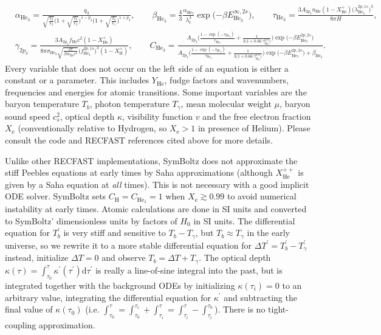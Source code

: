\documentclass{aa}
\newcommand\el{\mathrm{e}} %
\newcommand\Hy{\mathrm{H}} %
\newcommand\He{\mathrm{He}} %
\newcommand\Hesin{{\mathrm{He}_1}} %
\newcommand\Hetri{{\mathrm{He}_3}} %
\begin{document}
\begin{align*}
&
\alpha_\Hetri = \frac{q_3 }{ \sqrt{\frac{T_b}{T_2}} \Big(1+\sqrt{\frac{T_b}{T_2}}\Big)^{1-p_3} \Big(1+\sqrt{\frac{T_b}{T_1}}\Big)^{1+p_3} }, \qquad
\beta_\Hetri = \frac43 \frac{ \alpha_\Hetri }{ \lambda_\el^3 } \exp\big({-\beta E_\Hetri^{\infty,2s}}\big), \qquad
\tau_\Hetri = \frac{ 3 A_{2p_3} n_\He (1-X_\He^+) \big(\lambda_\Hetri^{2p,1s}\big)^3 }{ 8\pi H }, \\
&
\gamma_{2p_3} = \frac{ 3 A_{2p_3} f_\He c^2 (1-X_\He^+) }{ 8\pi \sigma_{\Hetri} \sqrt{\frac{2 \pi}{\beta m_\He c^2}} \big(f_\Hetri^{2p,1s}\big)^3 (1-X_\Hy^+) }, \qquad
C_\Hetri = \frac{ A_{2p_3} \bigg( \frac{1 - \exp({-\tau_\Hetri}) }{ \tau_\Hetri } + \frac{1}{3\big(1+0.66\,\gamma_{2p_3}^{0.9}\big)} \bigg) \exp\big({-\beta E_\Hetri^{2p,2s}}\big) }{ A_{2p_3} \bigg( \frac{1 - \exp({-\tau_\Hetri}) }{ \tau_\Hetri } + \frac{1}{3\big(1+0.66\,\gamma_{2p_3}^{0.9}\big)} \bigg) \exp\big({-\beta E_\Hetri^{2p,2s}}\big) + \beta_\Hetri } .
\end{align*}
Every variable that does not occur on the left side of an equation is either a constant or a parameter.
This includes $Y_\He$, fudge factors and wavenumbers, frequencies and energies for atomic transitions.
Some important variables are the baryon temperature $T_b$, photon temperature $T_\gamma$, mean molecular weight $\mu$, baryon sound speed $c_s^2$, optical depth $\kappa$, visibility function $v$ and the free electron fraction $X_\el$ (conventionally relative to Hydrogen, so $X_\el > 1$ in presence of Helium).
Please consult the code and RECFAST references cited above for more details.

Unlike other RECFAST implementations, SymBoltz does not approximate the stiff Peebles equations at early times by Saha approximations (although $X_\He^{++}$ is given by a Saha equation at \emph{all} times).
This is not necessary with a good implicit ODE solver.
SymBoltz sets $C_\Hy = C_\Hesin = 1$ when $X_\el \gtrsim 0.99$ to avoid numerical instability at early times.
Atomic calculations are done in SI units and converted to SymBoltz' dimensionless units by factors of $H_0$ in SI units.
The differential equation for $T_b^\prime$ is very stiff and sensitive to $T_b-T_\gamma$, but $T_b \approx T_\gamma$ in the early universe, so we rewrite it to a more stable differential equation for $\Delta T^\prime = T_b^\prime - T_\gamma^\prime$ instead, initialize $\Delta T = 0$ and observe $T_b = \Delta T + T_\gamma$.
The optical depth $\kappa(\tau) = \int_{\tau_0}^\tau \kappa^\prime(\tau^\prime) \mathrm{d}\tau^\prime$ is really a line-of-sine integral into the past,
but is integrated together with the background ODEs by initializing $\kappa(\tau_i) = 0$ to an arbitrary value, integrating the differential equation for $\kappa^\prime$ and subtracting the final value of $\kappa(\tau_0)$ (i.e. $\int_{\tau_0}^{\tau} = \int_{\tau_0}^{\tau_i} + \int_{\tau_i}^{\tau} = \int_{\tau_i}^{\tau} - \int_{\tau_i}^{\tau_0}$).
There is no tight-coupling approximation.
\end{document}
